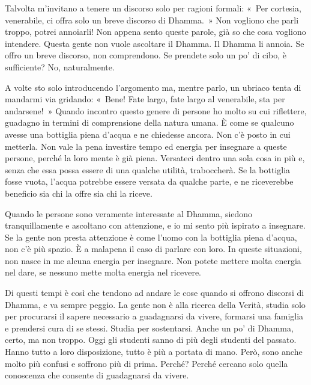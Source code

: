 Talvolta m'invitano a tenere un discorso solo per ragioni formali: «~Per
cortesia, venerabile, ci offra solo un breve discorso di Dhamma.~» Non
vogliono che parli troppo, potrei annoiarli! Non appena sento queste
parole, già so che cosa vogliono intendere. Questa gente non vuole
ascoltare il Dhamma. Il Dhamma li annoia. Se offro un breve discorso,
non comprendono. Se prendete solo un po' di cibo, è sufficiente? No,
naturalmente.

A volte sto solo introducendo l'argomento ma, mentre parlo, un ubriaco
tenta di mandarmi via gridando: «~Bene! Fate largo, fate largo al
venerabile, sta per andarsene!~» Quando incontro questo genere di
persone ho molto su cui riflettere, guadagno in termini di comprensione
della natura umana. È come se qualcuno avesse una bottiglia piena
d'acqua e ne chiedesse ancora. Non c'è posto in cui metterla. Non vale
la pena investire tempo ed energia per insegnare a queste persone,
perché la loro mente è già piena. Versateci dentro una sola cosa in più
e, senza che essa possa essere di una qualche utilità, traboccherà. Se
la bottiglia fosse vuota, l'acqua potrebbe essere versata da qualche
parte, e ne riceverebbe beneficio sia chi la offre sia chi la riceve.

Quando le persone sono veramente interessate al Dhamma, siedono
tranquillamente e ascoltano con attenzione, e io mi sento più ispirato a
insegnare. Se la gente non presta attenzione è come l'uomo con la
bottiglia piena d'acqua, non c'è più spazio. È a malapena il caso di
parlare con loro. In queste situazioni, non nasce in me alcuna energia
per insegnare. Non potete mettere molta energia nel dare, se nessuno
mette molta energia nel ricevere.

Di questi tempi è così che tendono ad andare le cose quando si offrono
discorsi di Dhamma, e va sempre peggio. La gente non è alla ricerca
della Verità, studia solo per procurarsi il sapere necessario a
guadagnarsi da vivere, formarsi una famiglia e prendersi cura di se
stessi. Studia per sostentarsi. Anche un po' di Dhamma, certo, ma non
troppo. Oggi gli studenti sanno di più degli studenti del passato. Hanno
tutto a loro disposizione, tutto è più a portata di mano. Però, sono
anche molto più confusi e soffrono più di prima. Perché? Perché cercano
solo quella conoscenza che consente di guadagnarsi da vivere.

